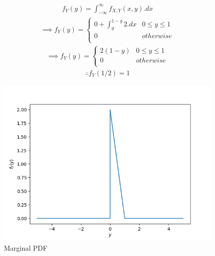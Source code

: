 
\begin{align}
    \tag{23.1}
    f_{Y}(y) = \int_{-\infty}^{\infty}f_{X,Y}(x,y).dx
\end{align}
\begin{align}
    \tag{23.2}
    \implies f_{Y}(y) = \left\{
    \begin{array}{ll}
      0+\int_{0}^{1-y}2.dx & 0\leq y\leq 1 \\
      0 & otherwise \\
    \end{array} 
    \right.
\end{align}
\begin{align}
    \tag{23.3}
    \implies f_{Y}(y) = \left\{
    \begin{array}{ll}
      2(1-y) & 0\leq y\leq 1 \\
      0 & otherwise \\
    \end{array} 
    \right.
\end{align}
\begin{align}
    \tag{23.4}
    \therefore f_{Y}(1/2) = 1
\end{align}
\begin{figure}
\centering
\includegraphics[width=\columnwidth]{solutions/adv/ma/2018/23/Figure/Plot.png}
\caption{Marginal PDF}
\label{fig:ma2018-23:marginal}
\end{figure}


